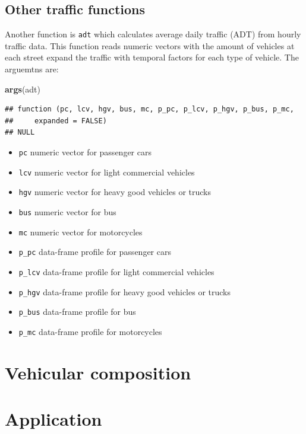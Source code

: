 \documentclass[12pt,graybox,envcountchap,sectrefs]{krantz}
\makeatletter
\newenvironment{Shaded}{\begin{snugshade}}{\end{snugshade}}
\newcommand{\KeywordTok}[1]{\textcolor[rgb]{0.13,0.29,0.53}{\textbf{#1}}}
\newcommand{\NormalTok}[1]{#1}
\providecommand{\tightlist}{%
  \setlength{\itemsep}{0pt}\setlength{\parskip}{0pt}}
\newenvironment{kframe}{%
\medskip{}
\setlength{\fboxsep}{.8em}
 \def\at@end@of@kframe{}%
 \ifinner\ifhmode%
  \def\at@end@of@kframe{\end{minipage}}%
  \begin{minipage}{\columnwidth}%
 \fi\fi%
 \def\FrameCommand##1{\hskip\@totalleftmargin \hskip-\fboxsep
 \colorbox{shadecolor}{##1}\hskip-\fboxsep
     \hskip-\linewidth \hskip-\@totalleftmargin \hskip\columnwidth}%
 \MakeFramed {\advance\hsize-\width
   \@totalleftmargin\z@ \linewidth\hsize
   \@setminipage}}%
 {\par\unskip\endMakeFramed%
 \at@end@of@kframe}
\renewenvironment{Shaded}{\begin{kframe}}{\end{kframe}}
\theoremstyle{definition}
\theoremstyle{definition}
\theoremstyle{definition}
\theoremstyle{remark}
\makeatother
\begin{document}
\subsection{Other traffic functions}\label{other-traffic-functions}

Another function is \texttt{adt} which calculates average daily traffic
(ADT) from hourly traffic data. This function reads numeric vectors with
the amount of vehicles at each street expand the traffic with temporal
factors for each type of vehicle. The arguemtns are:

\begin{Shaded}
\begin{Highlighting}[]
\KeywordTok{args}\NormalTok{(adt)}
\end{Highlighting}
\end{Shaded}

\begin{verbatim}
## function (pc, lcv, hgv, bus, mc, p_pc, p_lcv, p_hgv, p_bus, p_mc, 
##     expanded = FALSE) 
## NULL
\end{verbatim}

\begin{itemize}
\tightlist
\item
  \texttt{pc} numeric vector for passenger cars
\item
  \texttt{lcv} numeric vector for light commercial vehicles
\item
  \texttt{hgv} numeric vector for heavy good vehicles or trucks
\item
  \texttt{bus} numeric vector for bus
\item
  \texttt{mc} numeric vector for motorcycles
\item
  \texttt{p\_pc} data-frame profile for passenger cars
\item
  \texttt{p\_lcv} data-frame profile for light commercial vehicles
\item
  \texttt{p\_hgv} data-frame profile for heavy good vehicles or trucks
\item
  \texttt{p\_bus} data-frame profile for bus
\item
  \texttt{p\_mc} data-frame profile for motorcycles
\end{itemize}

\section{Vehicular composition}\label{vehicular-composition}

\section{Application}\label{application}
\end{document}
